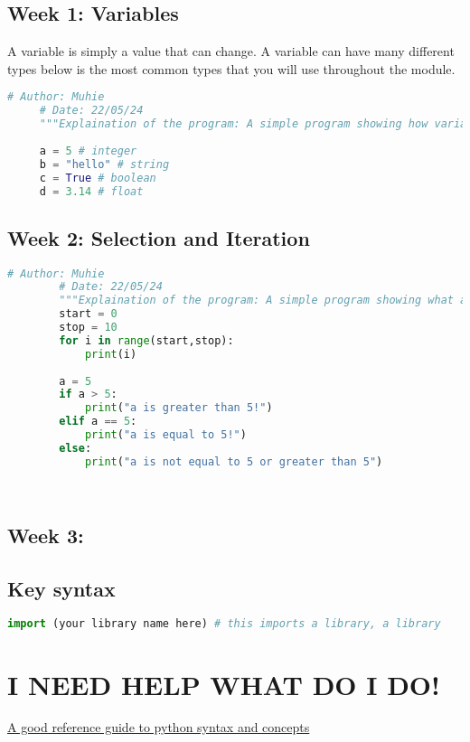 \documentclass{article}
\begin{document}
	 \subsection{Week 1: Variables}
	 A variable is simply a value that can change. A variable can have many different types below is the most common types that you will use throughout the module.
	 \begin{lstlisting}[language=python]
	 # Author: Muhie
	 # Date: 22/05/24
	 """Explaination of the program: A simple program showing how variables can be assigned in python"""
	 
	 a = 5 # integer
	 b = "hello" # string
	 c = True # boolean
	 d = 3.14 # float
	 \end{lstlisting}
	 
	 \subsection{Week 2: Selection and Iteration}
	 	 \begin{lstlisting}[language=python]
	 	# Author: Muhie
	 	# Date: 22/05/24
	 	"""Explaination of the program: A simple program showing what a for loop does and what an if statement is"""
	 	start = 0 
	 	stop = 10
	 	for i in range(start,stop):
	 		print(i)
	 		
	 	a = 5
	 	if a > 5:
	 		print("a is greater than 5!")
	 	elif a == 5:
	 		print("a is equal to 5!")
	 	else:
	 		print("a is not equal to 5 or greater than 5")
	 	
	 	
	 \end{lstlisting}
	 
	 
	 \subsection{Week 3: }
	 
	 
	 \subsection{Key syntax}
	\begin{lstlisting}[language=python]
	 	import (your library name here) # this imports a library, a library
	 \end{lstlisting}
	 
	
	\section{I NEED HELP WHAT DO I DO!}
	\href{https://www.w3schools.com/python/python_syntax.asp}{A good reference guide to python syntax and concepts}
	
\end{document}

